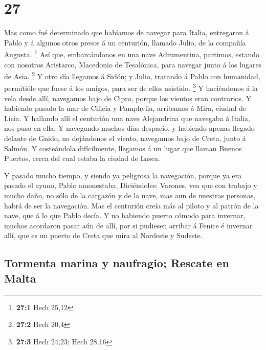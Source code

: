 \hypertarget{section-26}{%
\section{27}\label{section-26}}

 Mas como fué determinado que habíamos de navegar para
Italia, entregaron á Pablo y á algunos otros presos á un centurión,
llamado Julio, de la compañía Augusta. \footnote{\textbf{27:1} Hech
  25,12}  Así que, embarcándonos en una nave Adrumentina,
partimos, estando con nosotros Aristarco, Macedonio de Tesalónica, para
navegar junto á los lugares de Asia. \footnote{\textbf{27:2} Hech 20,4}
 Y otro día llegamos á Sidón; y Julio, tratando á Pablo con
humanidad, permitióle que fuese á los amigos, para ser de ellos
asistido. \footnote{\textbf{27:3} Hech 24,23; Hech 28,16}  Y
haciéndonos á la vela desde allí, navegamos bajo de Cipro, porque los
vientos eran contrarios.  Y habiendo pasado la mar de
Cilicia y Pamphylia, arribamos á Mira, ciudad de Licia.  Y
hallando allí el centurión una nave Alejandrina que navegaba á Italia,
nos puso en ella.  Y navegando muchos días despacio, y
habiendo apenas llegado delante de Gnido, no dejándonos el viento,
navegamos bajo de Creta, junto á Salmón.  Y costeándola
difícilmente, llegamos á un lugar que llaman Buenos Puertos, cerca del
cual estaba la ciudad de Lasea.

 Y pasado mucho tiempo, y siendo ya peligrosa la navegación,
porque ya era pasado el ayuno, Pablo amonestaba, 
Diciéndoles: Varones, veo que con trabajo y mucho daño, no sólo de la
cargazón y de la nave, mas aun de nuestras personas, habrá de ser la
navegación.  Mas el centurión creía más al piloto y al
patrón de la nave, que á lo que Pablo decía.  Y no habiendo
puerto cómodo para invernar, muchos acordaron pasar aún de allí, por si
pudiesen arribar á Fenice é invernar allí, que es un puerto de Creta que
mira al Nordeste y Sudeste.

\hypertarget{tormenta-marina-y-naufragio-rescate-en-malta}{%
\subsection{Tormenta marina y naufragio; Rescate en
Malta}\label{tormenta-marina-y-naufragio-rescate-en-malta}}

